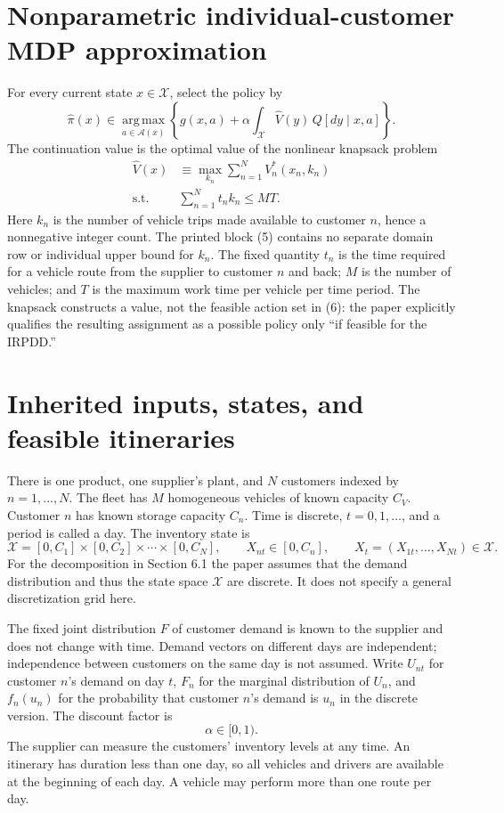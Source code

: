 \documentclass{article}
\begin{document}
\section*{Nonparametric individual-customer MDP approximation}

For every current state $x\in\mathcal X$, select the policy by
\begin{equation}
\hat\pi(x)\in\operatorname*{arg\,max}_{a\in\mathcal A(x)}
\left\{g(x,a)+\alpha\int_{\mathcal X}\hat V(y)\,Q[dy\mid x,a]\right\}.
\tag{6}
\end{equation}
The continuation value is the optimal value of the nonlinear knapsack problem
\begin{equation}
\begin{aligned}
\hat V(x)&\equiv\max_{k_n}\sum_{n=1}^{N}V_n^*(x_n,k_n)\\
\text{s.t.}\quad&\sum_{n=1}^{N}t_nk_n\leq MT.
\end{aligned}
\tag{5}
\end{equation}
Here $k_n$ is the number of vehicle trips made available to customer $n$, hence a nonnegative integer count. The printed block (5) contains no separate domain row or individual upper bound for $k_n$. The fixed quantity $t_n$ is the time required for a vehicle route from the supplier to customer $n$ and back; $M$ is the number of vehicles; and $T$ is the maximum work time per vehicle per time period. The knapsack constructs a value, not the feasible action set in (6): the paper explicitly qualifies the resulting assignment as a possible policy only ``if feasible for the IRPDD.''

\section*{Inherited inputs, states, and feasible itineraries}

There is one product, one supplier's plant, and $N$ customers indexed by $n=1,\ldots,N$. The fleet has $M$ homogeneous vehicles of known capacity $C_V$. Customer $n$ has known storage capacity $C_n$. Time is discrete, $t=0,1,\ldots$, and a period is called a day. The inventory state is
\[
\mathcal X=[0,C_1]\times[0,C_2]\times\cdots\times[0,C_N],\qquad
X_{nt}\in[0,C_n],\qquad
X_t=(X_{1t},\ldots,X_{Nt})\in\mathcal X.
\]
For the decomposition in Section 6.1 the paper assumes that the demand distribution and thus the state space $\mathcal X$ are discrete. It does not specify a general discretization grid here.

The fixed joint distribution $F$ of customer demand is known to the supplier and does not change with time. Demand vectors on different days are independent; independence between customers on the same day is not assumed. Write $U_{nt}$ for customer $n$'s demand on day $t$, $F_n$ for the marginal distribution of $U_n$, and $f_n(u_n)$ for the probability that customer $n$'s demand is $u_n$ in the discrete version. The discount factor is
\[
\alpha\in[0,1).
\]
The supplier can measure the customers' inventory levels at any time. An itinerary has duration less than one day, so all vehicles and drivers are available at the beginning of each day. A vehicle may perform more than one route per day.
\end{document}

